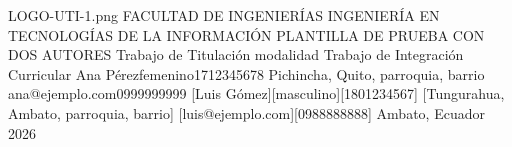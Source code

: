 \documentclass[12pt,a4paper,oneside]{report}
\begin{document}
\UTIPortada
{LOGO-UTI-1.png}
{FACULTAD DE INGENIERÍAS}
{INGENIERÍA EN TECNOLOGÍAS DE LA INFORMACIÓN}
{PLANTILLA DE PRUEBA CON DOS AUTORES}
{Trabajo de Titulación modalidad Trabajo de Integración Curricular}
{\UTIDatosAutores
  {Ana Pérez}{femenino}{1712345678}
  {Pichincha, Quito, parroquia, barrio}
  {ana@ejemplo.com}{0999999999}
  [Luis Gómez][masculino][1801234567]
  [Tungurahua, Ambato, parroquia, barrio]
  [luis@ejemplo.com][0988888888]}
{}
{Ambato, Ecuador}
{2026}
\UTIFrontMatter


\end{document}
